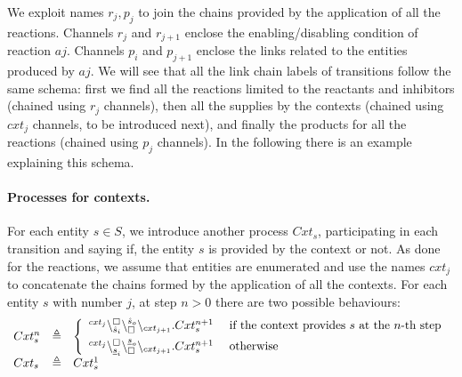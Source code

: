 \noindent
We exploit names $r_j,p_j$ to join the chains provided by the application of all the reactions. 
Channels $r_j$ and $r_{j+1}$ enclose the enabling/disabling condition of reaction $aj$.
Channels $p_i$ and $p_{j+1}$ enclose the links related to the entities produced by $aj$.
We will see that all the link chain labels of transitions follow the same schema: first we find all the reactions limited to the reactants and inhibitors (chained using $r_j$ channels), then all the supplies by the contexts (chained using $cxt_j$ channels, to be introduced next), and finally the products for all the reactions (chained using $p_j$ channels). 
In the following there is an example explaining this schema.

\paragraph{Processes for contexts.}
For each entity $s \in S$, we introduce another process $Cxt_s$,  participating in each transition and saying if, the entity $s$ is provided by the context or not.
As done for the reactions, we assume that entities are enumerated and use the names $cxt_j$ to concatenate
the chains formed by the application of all the contexts. 
For each entity $s$ with number $j$, at step $n >0$  there are two possible behaviours: 
\[
\begin{array}{lcl}
Cxt_{s}^n &\triangleq &
\left \{\begin{array}{ll}
 {}^{cxt_j}\backslash_{\hat{s}_i}^{\scriptstyle {\square}}\backslash_{\scriptstyle {\square}}^{\hat{s}_o}\backslash_{cxt_{j+1}}. Cxt_{s}^{n+1} & \ \mbox{if the context provides $s$  at the $n$-th step}\\[5pt] 
 {}^{cxt_j}\backslash_{\underline{s}_i}^{\scriptstyle {\square}}\backslash_{\scriptstyle {\square}}^{\underline{s}_o}\backslash_{cxt_{j+1}}.Cxt_s^{n+1} & \ \mbox{otherwise}
\end{array}\right.\\
Cxt_s & \triangleq & Cxt_s^1\\
\end{array}
\]

